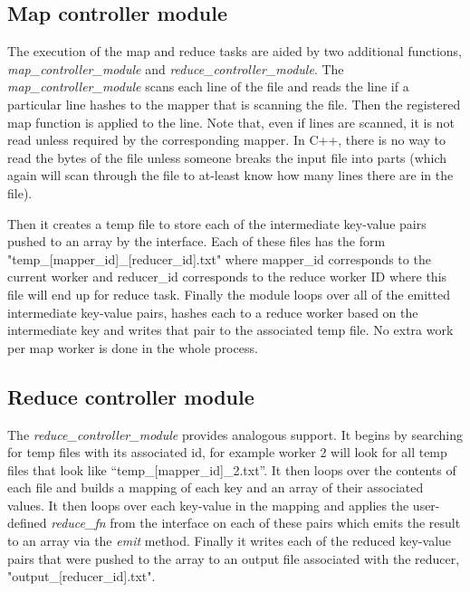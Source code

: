 \documentclass[conference, a4paper]{IEEEtran_ID}
\begin{document}
\subsection{Map controller module}

The execution of the map and reduce tasks are aided by two additional functions, \textit{map\_controller\_module} and \textit{reduce\_controller\_module}. The \textit{map\_controller\_module} scans each line of the file and reads the line if a particular line hashes to the mapper that is scanning the file. Then the registered map function is applied to the line. Note that, even if lines are scanned, it is not read unless required by the corresponding mapper. In C++, there is no way to read the bytes of the file unless someone breaks the input file into parts (which again will scan through the file to at-least know how many lines there are in the file).

Then it creates a temp file to store each of the intermediate key-value pairs pushed to an array by the interface. Each of these files has the form "temp\_[mapper\_id]\_[reducer\_id].txt" where mapper\_id corresponds to the current worker and reducer\_id corresponds to the reduce worker ID where this file will end up for reduce task. Finally the module loops over all of the emitted intermediate key-value pairs, hashes each to a reduce worker based on the intermediate key and writes that pair to the associated temp file. No extra work per map worker is done in the whole process.

\subsection{Reduce controller module}

The \textit{reduce\_controller\_module} provides analogous support. It begins by searching for temp files with its associated id, for example worker 2 will look for all temp files that look like “temp\_[mapper\_id]\_2.txt”. It then loops over the contents of each file and builds a mapping of each key and an array of their associated values. It then loops over each key-value in the mapping and applies the user-defined \textit{reduce\_fn} from the interface on each of these pairs which emits the result to an array via the \textit{emit} method. Finally it writes each of the reduced key-value pairs that were pushed to the array to an output file associated with the reducer, "output\_[reducer\_id].txt".
\end{document}
